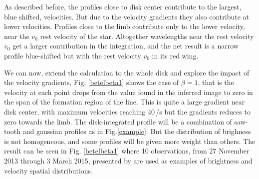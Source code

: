 \documentclass{/Users/art2/TeX/aanda/aa}
\begin{document}
As described before, the profiles close to disk center contribute to the largest, blue shifted, velocities. But due to the velocity gradients they 
also contribute at lower velocities. Profiles close to the limb contribute only to the lower velocity, near the $v_0$ rest velocity of the star. 
Altogether wavelengths near the rest velocity $v_0$ get a larger contribution in the integration, and the net result is a narrow profile blue-shifted but with the rest velocity $v_0$ in its red wing.


We can now, extend the calculation to the whole disk and explore the impact of the velocity gradients, Fig. \ref{betelbeta1} shows the case 
of $\beta=1$, that is the velocity at each point drops from the value found in the inferred image to zero 
in the span of the formation region of the line. This is quite a large gradient near disk center, with maximum velocities reaching 40\,\km/s but the gradients reduces to  zero towards the limb. The disk-integrated profile will be a combination of saw-tooth and gaussian 
profiles as in Fig.\ref{example}. But the distribution of brighness is not homogeneous, and some profiles will be given more weight 
than others. The result can be seen in Fig. \ref{betelbeta1} where  10 observations, from 27 November 2013 through 3 March 2015, presented by 
\cite{auriere_discovery_2016} are used as examples of brightness and velocity spatial distributions.
\end{document}
